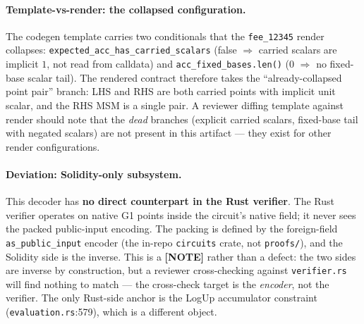 \paragraph{Template-vs-render: the collapsed configuration.}
The codegen template carries two conditionals that the
\texttt{fee\_12345} render collapses:
\texttt{expected\_\allowbreak{}acc\_\allowbreak{}has\_\allowbreak{}carried\_\allowbreak{}scalars} (false $\Rightarrow$
carried scalars are implicit $1$, not read from calldata) and
\texttt{acc\_\allowbreak{}fixed\_\allowbreak{}bases.len()} (0 $\Rightarrow$ no fixed-base
scalar tail). The rendered contract therefore takes the
``already-collapsed point pair'' branch: LHS and RHS are both
carried points with implicit unit scalar, and the RHS MSM is a
single pair. A reviewer diffing template against render should
note that the \emph{dead} branches (explicit carried scalars,
fixed-base tail with negated scalars) are not present in this
artifact --- they exist for other render configurations.

\paragraph{Deviation: Solidity-only subsystem.}
This decoder has \textbf{no direct counterpart in the Rust
verifier}. The Rust verifier operates on native G1 points inside
the circuit's native field; it never sees the packed public-input
encoding. The packing is defined by the foreign-field
\texttt{as\_public\_input} encoder (the in-repo \texttt{circuits}
crate, not \texttt{proofs/}), and the Solidity side is the
inverse. This is a \textcolor{mathpurple}{\textbf{[NOTE]}}
rather than a defect: the two sides are inverse by construction,
but a reviewer cross-checking against \texttt{verifier.rs} will
find nothing to match --- the cross-check target is the
\emph{encoder}, not the verifier. The only Rust-side anchor is
the LogUp accumulator constraint
(\texttt{evaluation.rs}:579), which is a different object.


